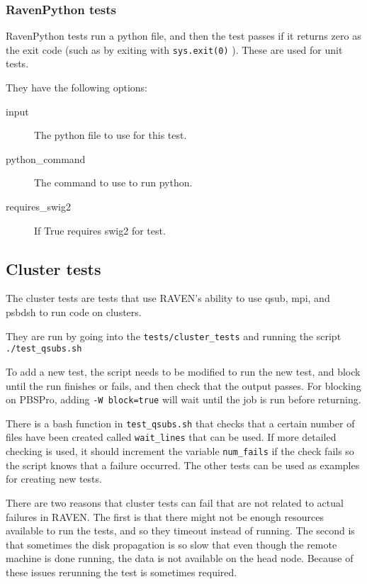 \documentclass{article}
\begin{document}
\subsubsection{RavenPython tests}

RavenPython tests run a python file, and then the test passes if it
returns zero as the exit code (such as by exiting with
\verb'sys.exit(0)' ).  These are used for unit tests.

They have the following options:

\begin{description}
\item[input] The python file to use for this test.
\item[python\_command] The command to use to run python.
\item[requires\_swig2] If True requires swig2 for test.
\end{description}

\subsection{Cluster tests}


The cluster tests are tests that use RAVEN's ability to use qsub, mpi,
and psbdsh to run code on clusters.

They are run by going into the \verb'tests/cluster_tests' and running
the script \verb'./test_qsubs.sh'

To add a new test, the script needs to be modified to run the new
test, and block until the run finishes or fails, and then check that
the output passes.  For blocking on PBSPro, adding
\verb'-W block=true' will wait until the job is run before returning.

There is a bash function in \verb'test_qsubs.sh' that checks that a
certain number of files have been created called \verb'wait_lines'
that can be used.  If more detailed checking is used, it should
increment the variable \verb'num_fails' if the check fails so the
script knows that a failure occurred.  The other tests can be used as
examples for creating new tests.

There are two reasons that cluster tests can fail that are not related
to actual failures in RAVEN.  The first is that there might not be
enough resources available to run the tests, and so they timeout
instead of running.  The second is that sometimes the disk propagation
is so slow that even though the remote machine is done running, the
data is not available on the head node.  Because of these issues
rerunning the test is sometimes required.
\end{document}
